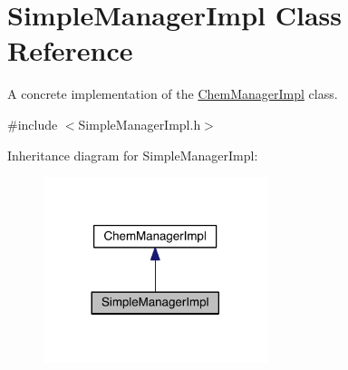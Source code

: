 \hypertarget{classSimpleManagerImpl}{\section{Simple\+Manager\+Impl Class Reference}
\label{classSimpleManagerImpl}
}


A concrete implementation of the \hyperlink{classChemManagerImpl}{Chem\+Manager\+Impl} class.  




{\ttfamily \#include $<$Simple\+Manager\+Impl.\+h$>$}



Inheritance diagram for Simple\+Manager\+Impl\+:\nopagebreak
\begin{figure}[H]
\begin{center}
\leavevmode
\includegraphics[width=185pt]{classSimpleManagerImpl__inherit__graph}
\end{center}
\end{figure}


